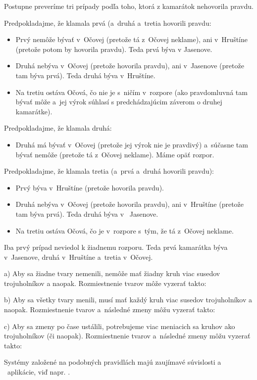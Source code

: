 {%
Postupne preveríme tri prípady podľa toho, ktorá z kamarátok nehovorila pravdu.

\smallskip
\noindent
Predpokladajme, že klamala prvá (a~druhá a~tretia hovorili pravdu:
\begin{itemize}
  \item Prvý nemôže bývať v~Očovej (pretože tá z~Očovej neklame), ani v~Hruštíne (pretože potom by hovorila pravdu).
  Teda prvá býva v Jasenove.
  \item Druhá nebýva v~Očovej (pretože hovorila pravdu), ani v~Jasenove (pretože tam býva prvá).
  Teda druhá býva v~Hruštíne.
  \item Na tretiu ostáva Očová, čo nie je s~ničím v~rozpore (ako pravdomluvná tam bývať môže a~jej výrok súhlasí s predchádzajúcim záverom o druhej kamarátke).
\end{itemize}

\noindent
Predpokladajme, že klamala druhá:
\begin{itemize}
  \item Druhá má bývať v~Očovej (pretože jej výrok nie je pravdivý) a~súčasne tam bývať nemôže (pretože tá z~Očovej neklame).
  Máme opäť rozpor.
\end{itemize}

\noindent
Predpokladajme, že klamala tretia (a~prvá a~druhá hovorili pravdu):
\begin{itemize}
  \item Prvý býva v~Hruštíne (pretože hovorila pravdu).
  \item Druhá nebýva v~Očovej (pretože hovorila pravdu), ani v~Hruštíne (pretože tam býva prvá).
  Teda druhá býva v ~Jasenove.
  \item Na tretiu ostáva Očová, čo je v~rozpore s~tým, že tá z~Očovej neklame.
\end{itemize}

\smallskip
Iba prvý prípad neviedol k žiadnemu rozporu.
Teda prvá kamarátka býva v~Jasenove, druhá v~Hruštíne a~tretia v~Očovej.
}

{%
a)
Aby sa žiadne tvary nemenili, nemôže mať žiadny kruh viac susedov trojuholníkov a naopak.
Rozmiestnenie tvarov môže vyzerať takto:
%

b)
Aby sa všetky tvary menili, musí mať každý kruh viac susedov trojuholníkov a naopak.
Rozmiestnenie tvarov a~následné zmeny môžu vyzerať takto:
%

c)
Aby sa zmeny po čase ustálili, potrebujeme viac meniacich sa kruhov ako trojuholníkov (či naopak).
Rozmiestnenie tvarov a~následné zmeny môžu vyzerať takto:
%

\poznamka
Systémy založené na podobných pravidlách majú zaujímavé súvislosti a ~aplikácie, viď napr.
.
}

